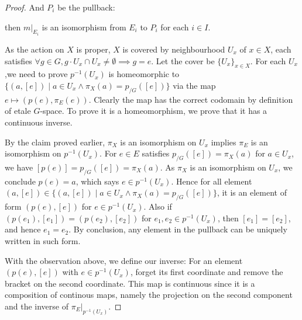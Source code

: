 \documentclass[a4paper]{article}
\DeclareMathOperator{\pr}{\sf pr}
\begin{document}
\begin{proof}
    And $P_i$ be the pullback:
    \begin{center}
    \end{center}
    
    then $m|_{E_i}$ is an isomorphism from $E_i$ to $P_i$ for each $i\in I$. 

    As the action on $X$ is proper, $X$ is covered by neighbourhood $U_x$ of $x\in X$, each satisfies $\forall g\in G, g\cdot U_x\cap U_x\ne\emptyset \implies g=e$. Let the cover be $\{U_x\}_{x\in X}$. For each $U_x$,we need to prove $p^{-1}(U_x)$ is homeomorphic to $\{(a,[e])\mid a\in U_x\land \pi_X(a)=p_{/G}([e])\}$ via the map $e\mapsto (p(e),\pi_E(e))$. Clearly the map has the correct codomain by definition of etale $G$-space. To prove it is a homeomorphism, we prove that it has a continuous inverse.
    
    By the claim proved earlier, $\pi_X$ is an isomorphism on $U_x$ implies $\pi_E$ is an isomorphism on $p^{-1}(U_x)$. For $e\in E$ satisfies $p_{/G}([e])=\pi_X(a)$ for $a\in U_x$, we have $[p(e)]=p_{/G}([e])=\pi_X(a)$. As $\pi_X$ is an isomorphism on $U_x$, we conclude $p(e)=a$, which says $e\in p^{-1}(U_x)$. Hence for all element $(a,[e])\in \{(a,[e])\mid a\in U_x\land \pi_X(a)=p_{/G}([e])\}$, it is an element of form $(p(e),[e])$ for $e\in p^{-1}(U_x)$. Also if $(p(e_1),[e_1])=(p(e_2),[e_2])$ for $e_1,e_2\in p^{-1}(U_x)$, then $[e_1]=[e_2]$, and hence $e_1=e_2$. By conclusion, any element in the pullback can be uniquely written in such form.

    With the observation above, we define our inverse: For an element $(p(e),[e])$ with $e\in p^{-1}(U_x)$, forget its first coordinate and remove the bracket on the second coordinate. This map is continuous since it is a composition of continous maps, namely the projection on the second component and the inverse of $\pi_E|_{p^{-1}(U_x)}$. 
    
   



\end{proof}
\end{document}
